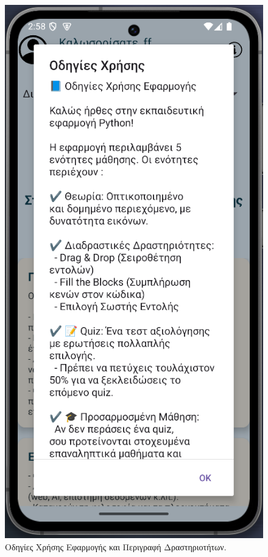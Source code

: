 \documentclass[11pt]{report}
\begin{document}
\begin{figure}[H]
  \centering
  \includegraphics[width=0.9\linewidth, height=0.35\textheight, keepaspectratio]{Figures/s4.png}
  \caption{Οδηγίες Χρήσης Εφαρμογής και Περιγραφή Δραστηριοτήτων.}
\end{figure}
\end{document}
